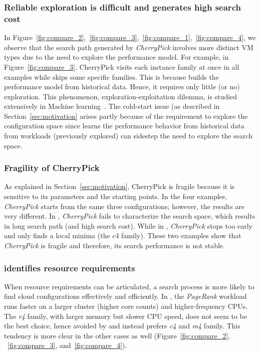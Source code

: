 \subsubsection*{Reliable exploration is difficult and generates high search cost}
In Figure~\ref{fig:compare_2},~\ref{fig:compare_3},~\ref{fig:compare_1},~\ref{fig:compare_4}, we observe that the search path generated by \emph{CherryPick} involves more distinct VM types due to the need to explore the performance model. For example, in Figure~\ref{fig:compare_3}, CherryPick visits each instance family at once in all examples while \scout skips some specific families.
This is because \scout builds the performance model from historical data. Hence, it requires only little (or no) exploration. This phenomenon, exploration-exploitation dilemma, is studied extensively in Machine learning~\cite{kaelbling1996reinforcement}. The cold-start issue (as described in Section~\ref{sec:motivation} arises partly because of the requirement to explore the configuration space since \scout learns the performance behavior from historical data from workloads (previously explored) can sidestep the need to explore the search space.




\subsubsection*{Fragility of CherryPick}
As explained in Section~\ref{sec:motivation}, CherryPick is fragile
because it is sensitive to its parameters and the starting points.
In the four examples, \emph{CherryPick} starts from the same three configurations; however, the results are very different.
In \myfigure{\ref{fig:compare_3}}, \emph{CherryPick} fails to characterize the search space, which results in long search path (and high search cost).
While in \myfigure{\ref{fig:compare_4}},
\emph{CherryPick} stops too early and only finds a local minima (the $c4$ family).
These two examples show that \emph{CherryPick} is fragile and therefore, its search performance is not stable.

\subsubsection*{\scout identifies resource requirements}
When resource requirements can be articulated, a search process is more likely to find cloud configurations effectively and efficiently. In \myfigure{\ref{fig:compare_1}},
the \emph{PageRank} workload runs faster on a larger cluster (higher core counts) and higher-frequency CPUs. The \emph{r4} family, with larger memory but slower CPU speed, does not seem to be the best choice, hence avoided by \scout and instead prefers \emph{c4} and \emph{m4} family.
This tendency is more clear in the other cases as well (Figure~\ref{fig:compare_2}, ~\ref{fig:compare_3}, and~\ref{fig:compare_4}).


